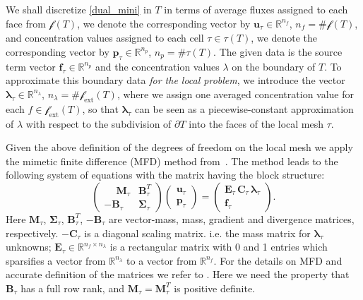 \documentclass[12pt]{article}
\newcommand{\vect}[1]{\boldsymbol{\mathbf{#1}}}
\newcommand{\bmesh}{{\vect{\mathcal T}}}
\newcommand{\mmesh}{{\vect{\mathcal \tau}}}
\newcommand{\mfaces}[1][]{{\vect{\mathcal f}_{\text{#1}}}}
\begin{document}
	We shall discretize \eqref{dual_mini} in $T$ in terms of average fluxes assigned to each face from $\mfaces(T)$,
	we denote the corresponding vector by ${\vect u}_\mmesh\in\mathbb{R}^{n_f}$, $n_f=\#\mfaces(T)$,  and concentration values assigned to each cell ${\tau \in \mmesh(T)}$, we denote the corresponding vector by ${\vect p}_\mmesh\in\mathbb{R}^{n_p}$, $n_p=\#\mmesh(T)$. The given data is the source term vector ${\vect f}_\mmesh\in \mathbb{R}^{n_p}$ and the concentration values $\lambda$ on the boundary of $T$.
	To approximate this boundary data \emph{for the local problem}, we introduce the vector
	${\vect \lambda}_\mmesh\in\mathbb{R}^{n_\lambda}$, $n_\lambda=\#\mfaces[ext](T)$,
	where we assign one averaged concentration value for each $f\in\mfaces[ext](T)$, so that ${\vect \lambda}_\mmesh$ can be seen as a piecewise-constant approximation of $\lambda$ with respect to the subdivision of $\partial T$ into the faces of the local mesh $\mmesh$.
	
	
	Given the above definition of the degrees of freedom on the local mesh we apply the mimetic finite difference (MFD) method from~\cite{lipnikov2014mimetic}. The method leads to the following system of equations with the matrix having the block structure:
	\begin{equation}\label{local}
		\begin{pmatrix}
			\phantom{-}\vect M_\mmesh & \vect B^T_\mmesh \\
			-\vect B_\mmesh & \vect \Sigma_\mmesh
		\end{pmatrix}
		\begin{pmatrix}
			{\vect u}_\mmesh \\
			{\vect p}_\mmesh
		\end{pmatrix}
		=
		\begin{pmatrix}
			\vect E_\mmesh\,\vect C_\mmesh\,{\vect \lambda}_\mmesh \\
			{\vect f}_\mmesh
		\end{pmatrix}.
	\end{equation}
	Here $\vect M_\mmesh$, $\vect\Sigma_\mmesh$, $\vect B^T_\mmesh$, $-\vect B_\mmesh$ are vector-mass, mass, gradient and divergence matrices, respectively. $-\vect C_\mmesh$ is a diagonal scaling matrix. i.e. the mass matrix for ${\vect \lambda}_\mmesh$ unknowns;
	$\vect E_\mmesh \in \mathbb{R}^{n_f \times n_\lambda}$ is a rectangular matrix with 0 and 1 entries which sparsifies a vector from  $\mathbb{R}^{n_{\lambda}}$
	to a vector from  $\mathbb{R}^{n_{f}}$.
	For the details on MFD and accurate definition of the matrices we refer to \cite{lipnikov2014mimetic,MFDbook}.
	Here we need the property that  $\vect B_\mmesh$ has a full row rank, and $\vect M_\mmesh = \vect M^T_\mmesh$ is positive definite.
	
\end{document}
